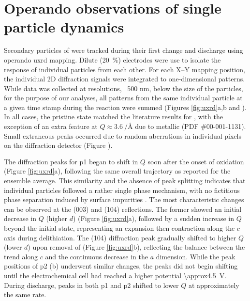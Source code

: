 \documentclass{article}
\begin{document}
\section{Operando observations of single particle dynamics}


Secondary particles of \nca{} were tracked during their first change
and discharge using operando \gls{uxrd} mapping. Dilute
(\SI{20}{\percent}) \nca{} electrodes were use to isolate the response
of individual particles from each other. For each X--Y mapping
position, the individual 2D diffraction signals were integrated to
one-dimensional patterns. While data was collected at resolutions,
~500 nm, below the size of the particles, for the purpose of our
analyses, all patterns from the same individual particle at a given
time stamp during the reaction were summed (Figures \ref{fig:uxrd}a,b
and ). In all cases, the pristine state matched
the literature results for \nca{} \cite{novak2015}, with the exception
of an extra feature at $Q\approx\SI{3.6}{\per\angstrom}$ due to
metallic  (PDF \#00-001-1131). Small extraneous peaks occurred
due to random aberrations in individual pixels on the diffraction
detector (Figure ).

The diffraction peaks for \gls{p1} began to shift in $Q$ soon after
the onset of oxidation (Figure \ref{fig:uxrd}a), following the same
overall trajectory as reported for the ensemble
average\cite{robert2015}. This similarity and the absence of peak
splitting indicates that individual particles followed a rather single
phase mechanism, with no fictitious phase separation induced by
surface impurities \cite{grenier2017}. The most characteristic changes
can be observed at the (003) and (104) reflections. The former showed
an initial decrease in $Q$ (higher $d$) (Figure \ref{fig:uxrd}a),
followed by a sudden increase in $Q$ beyond the initial state,
representing an expansion then contraction along the $c$ axis during
delithiation\citeme{}. The (104) diffraction peak gradually shifted to
higher $Q$ (lower $d$) upon removal of  (Figure
\ref{fig:uxrd}b), reflecting the balance between the trend along $c$
and the continuous decrease in the $a$ dimension.\cite{robert2015}
While the peak positions of \gls{p2} (b) underwent
similar changes, the peaks did not begin shifting until the
electrochemical cell had reached a higher potential
\SI{\approx4.5}{\volt}. During discharge, peaks in both \gls{p1} and
\gls{p2} shifted to lower $Q$ at approximately the same rate.
\end{document}
